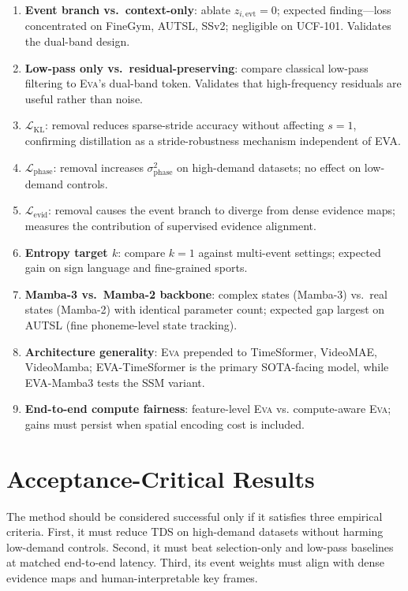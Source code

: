 \documentclass[10pt,twocolumn]{article}
\newcommand{\EVA}{\textsc{Eva}}
\newcommand{\TDS}{\ifmmode\mathrm{TDS}\else\textsc{TDS}\fi}
\begin{document}
\begin{enumerate}
    \item \textbf{Event branch vs.\ context-only}: ablate $z_{i,\mathrm{evt}}{=}0$;
    expected finding---loss concentrated on FineGym, AUTSL, SSv2;
    negligible on UCF-101. Validates the dual-band design.
    \item \textbf{Low-pass only vs.\ residual-preserving}: compare classical
    low-pass filtering to \EVA{}'s dual-band token. Validates that high-frequency
    residuals are useful rather than noise.
    \item \textbf{$\mathcal{L}_{\mathrm{KL}}$}: removal reduces sparse-stride
    accuracy without affecting $s{=}1$, confirming distillation as a
    stride-robustness mechanism independent of EVA.
    \item \textbf{$\mathcal{L}_{\mathrm{phase}}$}: removal increases
    $\sigma^2_{\mathrm{phase}}$ on high-demand datasets; no effect on
    low-demand controls.
    \item \textbf{$\mathcal{L}_{\mathrm{evid}}$}: removal causes the event
    branch to diverge from dense evidence maps; measures the contribution
    of supervised evidence alignment.
    \item \textbf{Entropy target $k$}: compare $k{=}1$ against multi-event
    settings; expected gain on sign language and fine-grained sports.
    \item \textbf{Mamba-3 vs.\ Mamba-2 backbone}: complex states (Mamba-3)
    vs.\ real states (Mamba-2) with identical parameter count; expected
    gap largest on AUTSL (fine phoneme-level state tracking).
    \item \textbf{Architecture generality}: \EVA{} prepended to TimeSformer,
    VideoMAE, VideoMamba; EVA-TimeSformer is the primary SOTA-facing model,
    while EVA-Mamba3 tests the SSM variant.
    \item \textbf{End-to-end compute fairness}: feature-level \EVA{} vs. compute-aware
    \EVA{}; gains must persist when spatial encoding cost is included.
\end{enumerate}

\section{Acceptance-Critical Results}
\label{sec:expected}

The method should be considered successful only if it satisfies three empirical
criteria. First, it must reduce \TDS{} on high-demand datasets without harming
low-demand controls. Second, it must beat selection-only and low-pass baselines
at matched end-to-end latency. Third, its event weights must align with dense
evidence maps and human-interpretable key frames.
\end{document}
